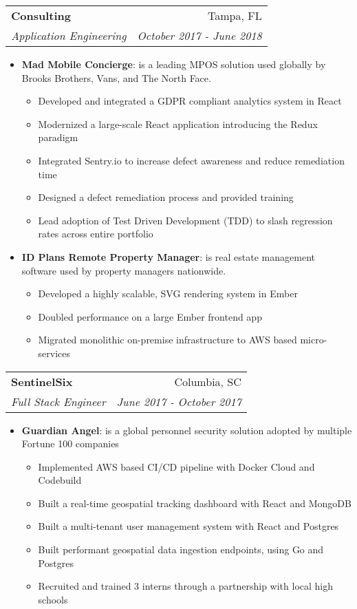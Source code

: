 \documentclass[a4paper]{article}
\makeatletter
\newcommand{\resumeItem}[2]{
  \item\small{
    \textbf{#1}{: #2 \vspace{-2pt}}
  }
}
\newcommand{\resumeSubheading}[4]{
  \vspace{-1pt}\item
    \begin{tabular*}{0.97\textwidth}[t]{l@{\extracolsep{\fill}}r}
      \textbf{#1} & #2 \\
      \textit{\small#3} & \textit{\small #4} \\
    \end{tabular*}\vspace{-5pt}
}
\newcommand{\resumeItemListStart}{\begin{itemize}}
\newcommand{\resumeItemListEnd}{\end{itemize}\vspace{-5pt}}
\makeatother
\begin{document}
	\resumeSubheading
		{Consulting}{Tampa, FL}
		{Application Engineering}{October 2017 - June 2018}
		\resumeItemListStart
			\resumeItem{Mad Mobile Concierge}
				{is a leading MPOS solution used globally by Brooks Brothers, Vans, and The North Face.}
				\begin{itemize}
					\item Developed and integrated a GDPR compliant analytics system in React
					\item Modernized a large-scale React application introducing the Redux paradigm
					\item Integrated Sentry.io to increase defect awareness and reduce remediation time
					\item Designed a defect remediation process and provided training
					\item Lead adoption of Test Driven Development (TDD) to slash regression rates across entire portfolio
				\end{itemize}
			\resumeItem{ID Plans Remote Property Manager}{is real estate management software used by property managers nationwide.}
				\begin{itemize}
					\item Developed a highly scalable, SVG rendering system in Ember
					\item Doubled performance on a large Ember frontend app
					\item Migrated monolithic on-premise infrastructure to AWS based micro-services
				\end{itemize}
		\resumeItemListEnd

	\resumeSubheading
		{SentinelSix}{Columbia, SC}
		{Full Stack Engineer}{June 2017 - October 2017}
		\resumeItemListStart
			\resumeItem{Guardian Angel}{is a global personnel security solution adopted by multiple Fortune 100 companies}
			\begin{itemize}
             \item Implemented AWS based CI/CD pipeline with Docker Cloud and Codebuild
             \item Built a real-time geospatial tracking dashboard with React and MongoDB
             \item Built a multi-tenant user management system with React and Postgres
             \item Built performant geospatial data ingestion endpoints, using Go and Postgres
             \item Recruited and trained 3 interns through a partnership with local high schools
            \end{itemize}
		\resumeItemListEnd
\end{document}
